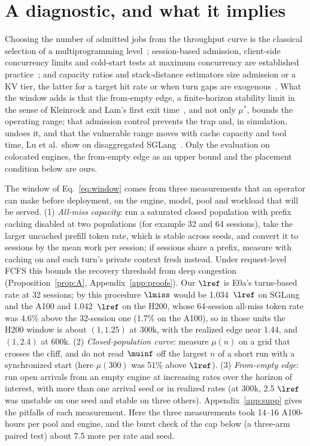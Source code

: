 \section{A diagnostic, and what it implies}\label{sec:diag}

Choosing the number of admitted jobs from the throughput curve is the classical selection of a multiprogramming level~\citep{denning1976optimal,heiss1991adaptive,schroeder2006mpl}; session-based admission, client-side concurrency limits and cold-start tests at maximum concurrency are established practice~\citep{cherkasova2002session,maurer2015fail,brooker2023ondemand}; and capacity ratios and stack-distance estimators size admission or a KV tier, the latter for a target hit rate or when turn gaps are exogenous~\citep{anon2026agentkv,li2026kvset,shao2026efficientagent,yao2026multiturn}. What the window adds is that the from-empty edge, a finite-horizon stability limit in the sense of Kleinrock and Lam's first exit time~\citep{kleinrock1975aloha}, and not only $\mu^*$, bounds the operating range; that admission control prevents the trap and, in simulation, undoes it, and that the vulnerable range moves with cache capacity and tool time, Lu et al.\ show on disaggregated SGLang~\citep{lu2026cachetrap}. Only the evaluation on colocated engines, the from-empty edge as an upper bound and the placement condition below are ours.

The window of Eq.~\eqref{eq:window} comes from three measurements that an operator can make before deployment, on the engine, model, pool and workload that will be served. (1) \emph{All-miss capacity}: run a saturated closed population with prefix caching disabled at two populations (for example 32 and 64 sessions), take the larger uncached prefill token rate, which is stable across seeds, and convert it to sessions by the mean work per session; if sessions share a prefix, measure with caching on and each turn's private context fresh instead. Under request-level FCFS this bounds the recovery threshold from deep congestion (Proposition~\ref{prop:A}, Appendix~\ref{app:proofs}). Our $\lref$ is E0a's turns-based rate at 32 sessions; by this procedure $\lmiss$ would be 1.034~$\lref$ on SGLang and the A100 and 1.042~$\lref$ on the H200, whose 64-session all-miss token rate was 4.6\% above the 32-session one (1.7\% on the A100), so in those units the H200 window is about $(1,1.25)$ at 300k, with the realized edge near 1.44, and $(1,2.4)$ at 600k. (2) \emph{Closed-population curve}: measure $\mu(n)$ on a grid that crosses the cliff, and do not read $\muinf$ off the largest $n$ of a short run with a synchronized start (here $\mu(300)$ was 51\% above $\lref$). (3) \emph{From-empty edge}: run open arrivals from an empty engine at increasing rates over the horizon of interest, with more than one arrival seed or in realized rates (at 300k, 2.5 $\lref$ was unstable on one seed and stable on three others). Appendix~\ref{app:supp} gives the pitfalls of each measurement. Here the three measurements took 14--16 A100-hours per pool and engine, and the burst check of the cap below (a three-arm paired test) about 7.5 more per rate and seed.

